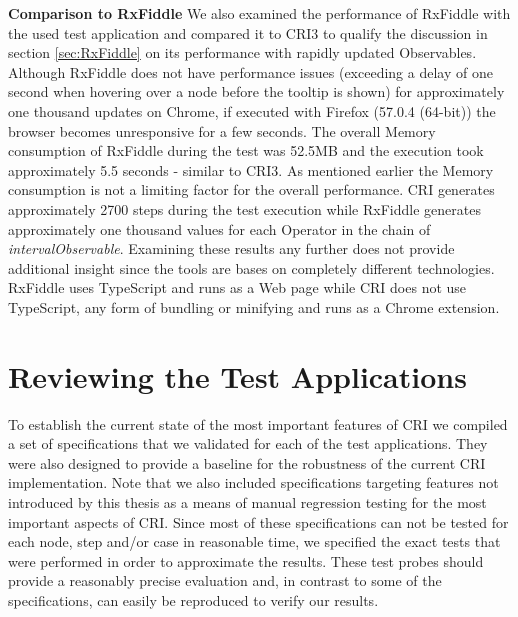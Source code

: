 	\textbf{Comparison to RxFiddle}
	We also examined the performance of RxFiddle with the used test application and compared it to CRI3 to qualify the discussion in section \ref{sec:RxFiddle} on its performance with rapidly updated Observables.
	Although RxFiddle does not have performance issues (exceeding a delay of one second when hovering over a node before the tooltip is shown) for approximately one thousand updates on Chrome, if executed with Firefox (57.0.4 (64-bit)) the browser becomes unresponsive for a few seconds. The overall Memory consumption of RxFiddle during the test was 52.5MB and the execution took approximately 5.5 seconds - similar to CRI3. As mentioned earlier the Memory consumption is not a limiting factor for the overall performance. CRI generates approximately 2700 steps during the test execution while RxFiddle generates approximately one thousand values for each Operator in the chain of \emph{intervalObservable}. Examining these results any further does not provide additional insight since the tools are bases on completely different technologies. RxFiddle uses TypeScript and runs as a Web page while CRI does not use TypeScript, any form of bundling or minifying and runs as a Chrome extension.
	
\section{Reviewing the Test Applications}
\label{sec:EvalTests}
To establish the current state of the most important features of CRI we compiled a set of specifications that we validated for each of the test applications. They were also designed to provide a baseline for the robustness of the current CRI implementation. Note that we also included specifications targeting features not introduced by this thesis as a means of manual regression testing for the most important aspects of CRI. Since most of these specifications can not be tested for each node, step and/or case in reasonable time, we specified the exact tests that were performed in order to approximate the results. These test probes should provide a reasonably precise evaluation and, in contrast to some of the specifications, can easily be reproduced to verify our results.

